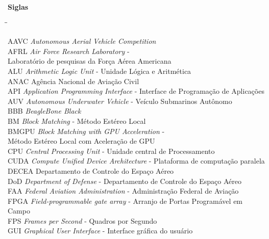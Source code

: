 \textbf{\Huge{Siglas}}

\vspace{0.05\textheight}

\begin{tabbing}
\hspace*{0.5cm}\=\hspace{2.5cm}\= \kill

\> AAVC		\> \textit{Autonomous Aerial Vehicle Competition}									\\
\> AFRL		\> \textit{Air Force Research Laboratory} -				 						\\
\>		\> Laboratório de pesquisas da Força Aérea Americana 									\\ 
\> ALU		\> \textit{Arithmetic Logic Unit} - Unidade Lógica e Aritmética				 				\\ 
\> ANAC		\> Agência Nacional de Aviação Civil 											\\
\> API		\> \textit{Application Programming Interface} - Interface de Programação de Aplicações					\\
\> AUV		\> \textit{Autonomous Underwater Vehicle} - Veículo Submarinos Autônomo	 						\\
\> BBB		\> \textit{BeagleBone Black}	 											\\
\> BM		\> \textit{Block Matching} - Método Estéreo Local	 								\\
\> BMGPU	\> \textit{Block Matching with GPU Acceleration} - 									\\
\>		\> Método Estéreo Local com Aceleração de GPU										\\
\> CPU		\> \textit{Central Processing Unit} - Unidade central de Processamento							\\
\> CUDA		\> \textit{Compute Unified Device Architecture} - Plataforma de computação paralela					\\
\> DECEA	\> Departamento de Controle do Espaço Aéreo										\\
\> DoD		\> \textit{Department of Defense} - Departamento de Controle do Espaço Aéreo						\\
\> FAA	 	\> \textit{Federal Aviation Administration} - Administração Federal de Aviação						\\
\> FPGA  	\> \textit{Field-programmable gate array} - Arranjo de Portas Programável em Campo					\\
\> FPS  	\> \textit{Frames per Second} - Quadros por Segundo									\\
\> GUI 	 	\> \textit{Graphical User Interface} - Interface gráfica do usuário							\\

\end{tabbing}
